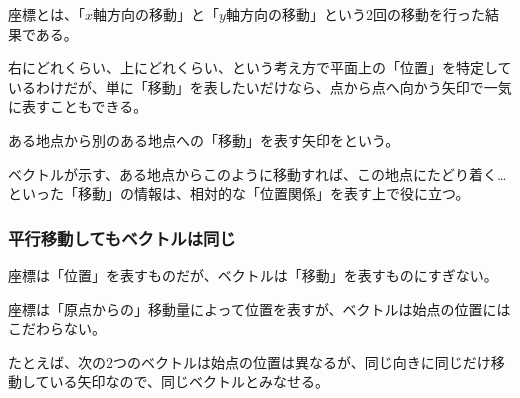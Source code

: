 \documentclass[../../imaging-math]{subfiles}
\begin{document}
\br

座標とは、「$x$軸方向の移動」と「$y$軸方向の移動」という2回の移動を行った結果である。

右にどれくらい、上にどれくらい、という考え方で平面上の「位置」を特定しているわけだが、単に「移動」を表したいだけなら、点から点へ向かう矢印で一気に表すこともできる。

\br

ある地点から別のある地点への「移動」を表す矢印をという。

\br

ベクトルが示す、ある地点からこのように移動すれば、この地点にたどり着く…といった「移動」の情報は、相対的な「位置関係」を表す上で役に立つ。

\subsubsection{平行移動してもベクトルは同じ}

座標は「位置」を表すものだが、ベクトルは「移動」を表すものにすぎない。

座標は「原点からの」移動量によって位置を表すが、ベクトルは始点の位置にはこだわらない。

\br

たとえば、次の2つのベクトルは始点の位置は異なるが、同じ向きに同じだけ移動している矢印なので、同じベクトルとみなせる。

\begin{center}
\end{center}
\end{document}
